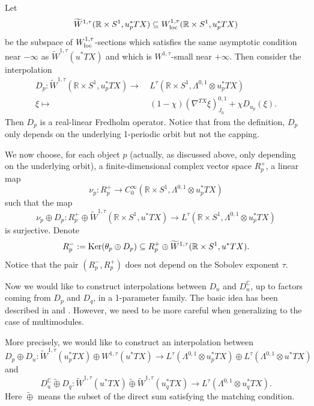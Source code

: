 \documentclass[reqno, 10pt]{amsart}
\numberwithin{equation}{section}
\numberwithin{equation}{section}
\renewcommand{\subset}{\subseteq}
\theoremstyle{definition}
\theoremstyle{remark}
\newcommand{\beq}{\begin{equation}}
\newcommand{\eeq}{\end{equation}}
\newcommand{\beqn}{\begin{equation*}}
\newcommand{\eeqn}{\end{equation*}}
\newcommand{\mb}{\mathbb}
\newcommand{\wt}{\widetilde}
\begin{document}
Let 
\beqn
\wt W^{1,\tau}({\mb R}\times S^1, u_p^* TX) \subset W^{1,\tau}_{\rm loc}({\mb R}\times S^1, u_p^* TX)
\eeqn
be the subspace of $W^{1,\tau}_{\rm loc}$-sections which satisfies the same asymptotic condition near $-\infty$ as $\wt W^{1,\tau}(u^* TX)$ and which is $W^{1,\tau}$-small near $+\infty$. Then consider the interpolation
\beq\label{operator_dp}
\begin{split}
D_p: \wt W^{1,\tau} ({\mb R}\times S^1, u_p^* TX) \to &\  L^\tau ({\mb R}\times S^1, \Lambda^{0,1}\otimes u_p^* TX)\\
\xi\mapsto &\  ( 1- \chi) (\nabla^{TX} \xi)_{J_0}^{0,1} + \chi D_{u_p} ( \xi).
\end{split}
\eeq
Then $D_p$ is a real-linear Fredholm operator. Notice that from the definition, $D_p$ only depends on the underlying 1-periodic orbit but not the capping.

We now choose, for each object $p$ (actually, as discussed above, only depending on the underlying orbit), a finite-dimensional complex vector space $R_p^+$, a linear map
\beq\label{eqn_nup}
\nu_p: R_p^+ \to C_0^\infty( {\mb R}\times S^1, \Lambda^{0,1} \otimes u_p^* TX)
\eeq
such that the map
\beqn
\nu_p \oplus D_p: R_p^+ \oplus \wt W^{1,\tau} ({\mb R}\times S^1, u^* TX) \to L^\tau ({\mb R}\times S^1, \Lambda^{0,1}\otimes u_p^* TX)
\eeqn
is surjective. Denote
\beqn
R_p^-:= {\rm Ker}( \theta_p \oplus D_p) \subset R_p^+ \oplus \wt W^{1,\tau}({\mb R}\times S^1, u^* TX).
\eeqn
Notice that the pair $(R_p^-, R_p^+)$ does not depend on the Sobolev exponent $\tau$. 

Now we would like to construct interpolations between $D_u$ and $D_u^{\mb C}$, up to factors coming from $D_p$ and $D_q$, in a 1-parameter family. The basic idea has been described in \cite[Section 11]{Abouzaid_Blumberg} and \cite[Appendix B]{Abouzaid_Blumberg_2024}. However, we need to be more careful when generalizing to the case of multimodules. 

More precisely, we would like to construct an interpolation  between 
\beqn
D_p \oplus D_u: \wt W^{1,\tau }(u_p^* TX) \oplus W^{1,\tau }(u^* TX) \to L^\tau (\Lambda^{0,1} \otimes u_p^* TX) \oplus L^\tau ( \Lambda^{0,1} \otimes u^* TX)
\eeqn
and 
\beqn
D_u^{\mb C} \wt \oplus D_q: \wt W^{1, \tau}(u^* TX) \wt \oplus \wt W^{1,\tau }(u_q^* TX) \to L^\tau (\Lambda^{0,1}\otimes u_q^* TX).
\eeqn
Here $\wt \oplus$ means the subset of the direct sum satisfying the matching condition. 
\end{document}
